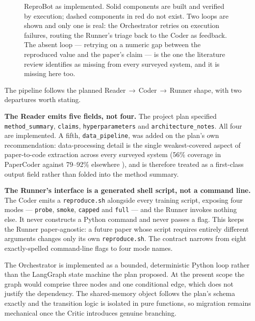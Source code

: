 \documentclass[10pt,twocolumn]{article}
\begin{document}
\begin{figure}[tbp]
\caption{ReproBot as implemented. Solid components are built and verified by execution;
dashed components in red do not exist. Two loops are shown and only one is real: the
Orchestrator retries on execution failures, routing the Runner's triage back to the Coder
as feedback. The absent loop --- retrying on a numeric gap between the reproduced value
and the paper's claim --- is the one the literature review identifies as missing from
every surveyed system, and it is missing here too.}
\label{fig:pipeline}
\end{figure}


The pipeline follows the planned Reader\,$\to$\,Coder\,$\to$\,Runner shape, with two
departures worth stating.

\textbf{The Reader emits five fields, not four.} The project plan specified
\texttt{method\_summary}, \texttt{claims}, \texttt{hyperparameters} and
\texttt{architecture\_notes}. All four are implemented. A fifth,
\texttt{data\_pipeline}, was added on the plan's own recommendation: data-processing
detail is the single weakest-covered aspect of paper-to-code extraction across every
surveyed system (56\% coverage in PaperCoder against 79--92\% elsewhere
\cite{seo2025papercoder}), and is therefore treated as a first-class output field rather
than folded into the method summary.

\textbf{The Runner's interface is a generated shell script, not a command line.} The
Coder emits a \texttt{reproduce.sh} alongside every training script, exposing four modes
--- \texttt{probe}, \texttt{smoke}, \texttt{capped} and \texttt{full} --- and the Runner
invokes nothing else. It never constructs a Python command and never passes a flag. This
keeps the Runner paper-agnostic: a future paper whose script requires entirely different
arguments changes only its own \texttt{reproduce.sh}. The contract narrows from eight
exactly-spelled command-line flags to four mode names.

The Orchestrator is implemented as a bounded, deterministic Python loop rather than the
LangGraph state machine the plan proposed. At the present scope the graph would comprise
three nodes and one conditional edge, which does not justify the dependency. The
shared-memory object follows the plan's schema exactly and the transition logic is
isolated in pure functions, so migration remains mechanical once the Critic introduces
genuine branching.
\end{document}
